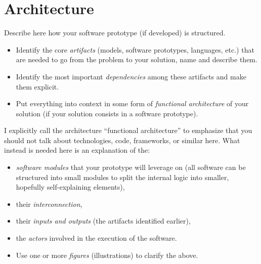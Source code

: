 \section{Architecture}
\label{sec:architecture}
Describe here how your software prototype (if developed) is structured. 

\begin{itemize}
\item[\Square] Identify the core \emph{artifacts} (models, software prototypes, languages, etc.) that are needed to go from the problem to your solution, name and describe them.
\item[\Square] Identify the most important \emph{dependencies} among these artifacts and make them explicit.
\item[\Square] Put everything into context in some form of \emph{functional architecture} of your solution (if your solution consists in a software prototype).
\end{itemize}

I explicitly call the architecture ``functional architecture'' to emphasize that you should not talk about technologies, code, frameworks, or similar here. What instead is needed here is an explanation of the:

\begin{itemize}
\item[\Square] \emph{software modules} that your prototype will leverage on (all software can be structured into small modules to split the internal logic into smaller, hopefully self-explaining elements),
\item[\Square] their \emph{interconnection},
\item[\Square] their \emph{inputs and outputs} (the artifacts identified earlier), 
\item[\Square] the \emph{actors} involved in the execution of the software.
\item[\Square] Use one or more \emph{figures} (illustrations) to clarify the above.
\end{itemize}